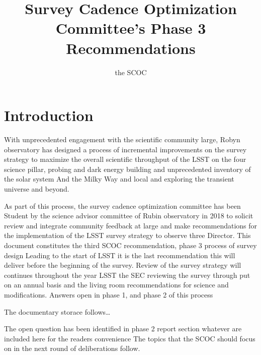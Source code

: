 \documentclass[PST,authoryear,toc]{lsstdoc}
\title{Survey Cadence Optimization Committee’s Phase 3 Recommendations}
\author{%
the SCOC
}
\date{\vcsDate}
\begin{document}
\maketitle

\section{Introduction}

With unprecedented engagement with the scientific community large, Robyn observatory has designed a process of incremental improvements on the survey strategy to maximize the overall scientific throughput of the LSST on the four science pillar, probing and dark energy building and unprecedented inventory of the solar system And the Milky Way and local and exploring the transient universe and beyond.

As part of this process, the survey cadence optimization committee has been Student by the science advisor committee of Rubin observatory in 2018 to solicit review and integrate community feedback at large and make recommendations for the implementation of the LSST survey strategy to observe three Director. This document constitutes the third SCOC recommendation, phase 3 process of survey design Leading to the start of LSST it is the last recommendation this will deliver before the beginning of the survey. Review of the survey strategy will continues throughout the year LSST the SEC reviewing the survey through put on an annual basis and the living room recommendations for science and modifications. Answers open in phase 1, and phase 2 of this process



The documentary storace follows… 

The open question has been identified in phase 2 report section whatever are included here for the readers convenience
The topics that the SCOC should focus on in the next round of deliberations follow.
\end{document}
